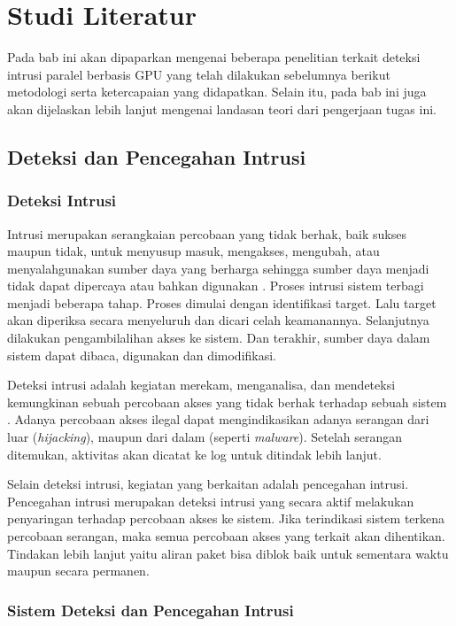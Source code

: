 \chapter{Studi Literatur}

  Pada bab ini akan dipaparkan mengenai beberapa penelitian terkait deteksi intrusi paralel berbasis GPU yang telah dilakukan sebelumnya berikut metodologi serta ketercapaian yang didapatkan. Selain itu, pada bab ini juga akan dijelaskan lebih lanjut mengenai landasan teori dari pengerjaan tugas ini.


\section{Deteksi dan Pencegahan Intrusi}

  \subsection{Deteksi Intrusi}

    Intrusi merupakan serangkaian percobaan yang tidak berhak, baik sukses maupun tidak, untuk menyusup masuk, mengakses, mengubah, atau menyalahgunakan sumber daya yang berharga sehingga sumber daya menjadi tidak dapat dipercaya atau bahkan digunakan \parencite{kizza2015}. Proses intrusi sistem terbagi menjadi beberapa tahap. Proses dimulai dengan identifikasi target. Lalu target akan diperiksa secara menyeluruh dan dicari celah keamanannya. Selanjutnya dilakukan pengambilalihan akses ke sistem. Dan terakhir, sumber daya dalam sistem dapat dibaca, digunakan dan dimodifikasi. 

    Deteksi intrusi adalah kegiatan merekam, menganalisa, dan mendeteksi kemungkinan sebuah percobaan akses yang tidak berhak terhadap sebuah sistem \parencite{kizza2015}. Adanya percobaan akses ilegal dapat mengindikasikan adanya serangan dari luar (\emph{hijacking}), maupun dari dalam (seperti \emph{malware}). Setelah serangan ditemukan, aktivitas akan dicatat ke log untuk ditindak lebih lanjut.

    Selain deteksi intrusi, kegiatan yang berkaitan adalah pencegahan intrusi. Pencegahan intrusi merupakan deteksi intrusi yang secara aktif melakukan penyaringan terhadap percobaan akses ke sistem. Jika terindikasi sistem terkena percobaan serangan, maka semua percobaan akses yang terkait akan dihentikan. Tindakan lebih lanjut yaitu aliran paket bisa diblok baik untuk sementara waktu maupun secara permanen.

  \subsection{Sistem Deteksi dan Pencegahan Intrusi}

